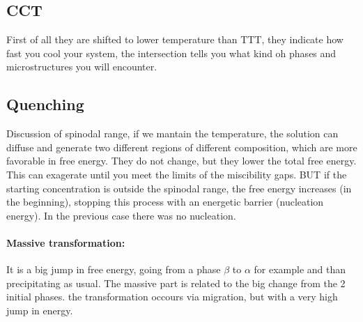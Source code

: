 \subsection{CCT}

First of all they are shifted to lower temperature than TTT, they indicate how fast you cool your system, the intersection tells you what kind oh phases and microstructures you will encounter.

\subsection{Quenching}

Discussion of spinodal range, if we mantain the temperature, the solution can diffuse and generate two different regions of different composition, which are more favorable in free energy. They do not change, but they lower the total free energy. This can exagerate until you meet the limits of the miscibility gaps. BUT if the starting concentration is outside the spinodal range, the free energy increases (in the beginning), stopping this process with an energetic barrier (nucleation energy). In the previous case there was no nucleation.  

\paragraph{Massive transformation:} It is a big jump in free energy, going from a phase $\beta$ to $\alpha$ for example and than precipitating as usual. The massive part is related to the big change from the 2 initial phases. the transformation occours via migration, but with a very high jump in energy. 